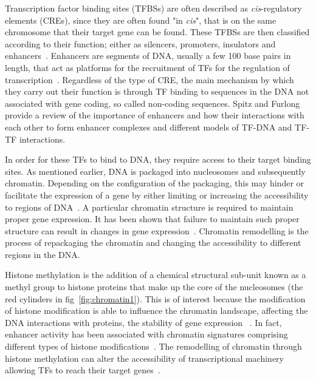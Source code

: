         Transcription factor binding sites (TFBSs) are often described as \emph{cis}-regulatory elements (CREs), since they are often found "in \emph{cis}", that is on the same chromosome that their target gene can be found. These TFBSs are then classified according to their function; either as silencers, promoters, insulators and enhancers~\cite{gaszner2006insulators, gross1988nuclease, li1999locus}. Enhancers are segments of DNA, usually a few 100 base pairs in length, that act as platforms for the recruitment of TFs for the regulation of transcription~\cite{spitz2012transcription}. Regardless of the type of CRE, the main mechanism by which they carry out their function is through TF binding to sequences in the DNA not associated with gene coding, so called non-coding sequences. Spitz and Furlong~\cite{spitz2012transcription} provide a review of the importance of enhancers and how their interactions with each other to form enhancer complexes and different models of TF-DNA and TF-TF interactions. 
        
        In order for these TFs to bind to DNA, they require access to their target binding sites. As mentioned earlier, DNA is packaged into nucleosomes and subsequently chromatin. Depending on the configuration of the packaging, this may hinder or facilitate the expression of a gene by either limiting or increasing the accessibility to regions of DNA~\cite{li2007role}. A particular chromatin structure is required to maintain proper gene expression. It has been shown that failure to maintain such proper structure can result in changes in gene expression~\cite{ehrlich2001dna}. Chromatin remodelling is the process of repackaging the chromatin and changing the accessibility to different regions in the DNA. %

        Histone methylation is the addition of a chemical structural sub-unit known as a methyl group to histone proteins that make up the core of the nucleosomes (the red cylinders in fig~\ref{fig:chromatin1}). This is of interest because the modification of histone modification is able to influence the chromatin landscape, affecting the DNA interactions with proteins, the stability of gene expression ~\cite{jaenisch2003epigenetic, whetstine2009histone}.
        In fact, enhancer activity has been associated with chromatin signatures comprising different types of histone modifications~\cite{heintzman2007distinct, creyghton2010histone, rada2011unique}.
        The remodelling of chromatin through histone methylation can alter the accessibility of transcriptional machinery allowing TFs to reach their target genes~\cite{gibney2010epigenetics, holoch2015rna}. 
        
